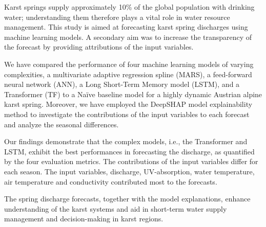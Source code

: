 \noindent

Karst springs supply approximately 10\% of the global population with drinking water; understanding them therefore plays a vital role in water resource management. This study is aimed at forecasting karst spring discharges using machine learning models. A secondary aim was to increase the transparency of the forecast by providing attributions of the input variables. 

We have compared the performance of four machine learning models of varying complexities, a multivariate adaptive regression spline (MARS), a feed-forward neural network (ANN), a Long Short-Term Memory model (LSTM), and a Transformer (TF) to a Naïve baseline model for a highly dynamic Austrian alpine karst spring. Moreover, we have employed the DeepSHAP model explainability method to investigate the contributions of the input variables to each forecast and analyze the seasonal differences.

Our findings demonstrate that the complex models, i.e., the Transformer and LSTM, exhibit the best performances in forecasting the discharge, as quantified by the four evaluation metrics. The contributions of the input variables differ for each season. The input variables, discharge, UV-absorption, water temperature, air temperature and conductivity contributed most to the forecasts. 

The spring discharge forecasts, together with the model explanations, enhance understanding of the karst systems and aid in short-term water supply management and decision-making in karst regions.
\newpage{}
{}
\begin{flushleft}








\end{flushleft}

